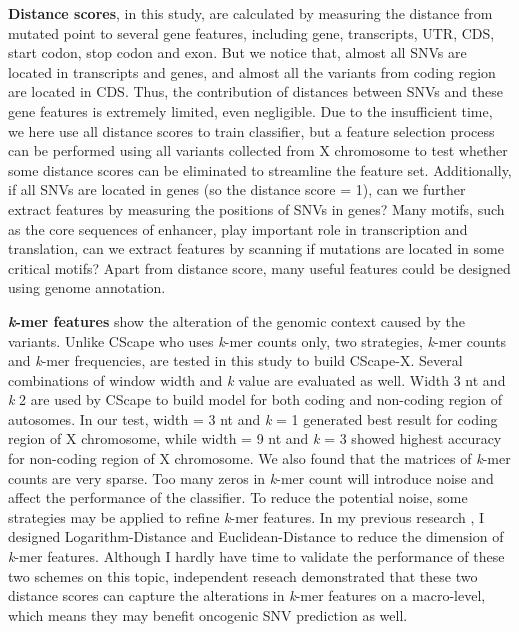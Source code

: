 \documentclass[a4paper,nohyper,nobib,openany,justified]{tufte-book}
\begin{document}
\begin{fullwidth}
\textbf{Distance scores}, in this study, are calculated by measuring the distance from mutated point to several gene features, including gene, transcripts, UTR, CDS, start codon, stop codon and exon. But we notice that, almost all SNVs are located in transcripts and genes, and almost all the variants from coding region are located in CDS. Thus, the contribution of distances between SNVs and these gene features is extremely limited, even negligible. Due to the insufficient time, we here use all distance scores to train classifier, but a feature selection process can be performed using all variants collected from X chromosome to test whether some distance scores can be eliminated to streamline the feature set. Additionally, if all SNVs are located in genes (so the distance score = 1), can we further extract features by measuring the positions of SNVs in genes? Many motifs, such as the core sequences of enhancer, play important role in transcription and translation, can we extract features by scanning if mutations are located in some critical motifs? Apart from distance score, many useful features could be designed using genome annotation.

\textbf{\emph{k}-mer features} show the alteration of the genomic context caused by the variants. Unlike CScape who uses \emph{k}-mer counts only, two strategies, \emph{k}-mer counts and \emph{k}-mer frequencies, are tested in this study to build CScape-X. Several combinations of window width and \emph{k} value are evaluated as well. Width 3 nt and \emph{k} 2 are used by CScape to build model for both coding and non-coding region of autosomes. In our test, width = 3 nt and \emph{k} = 1 generated best result for coding region of X chromosome, while width = 9 nt and \emph{k} = 3 showed highest accuracy for non-coding region of X chromosome. We also found that the matrices of \emph{k}-mer counts are very sparse. Too many zeros in \emph{k}-mer count will introduce noise and affect the performance of the classifier. To reduce the potential noise, some strategies may be applied to refine \emph{k}-mer features. In my previous research \cite{Han2018}, I designed Logarithm-Distance and Euclidean-Distance to reduce the dimension of \emph{k}-mer features. Although I hardly have time to validate the performance of these two schemes on this topic, independent reseach \cite{Amin2019} demonstrated that these two distance scores can capture the alterations in \emph{k}-mer features on a macro-level, which means they may benefit oncogenic SNV prediction as well.


\end{fullwidth}
\end{document}

